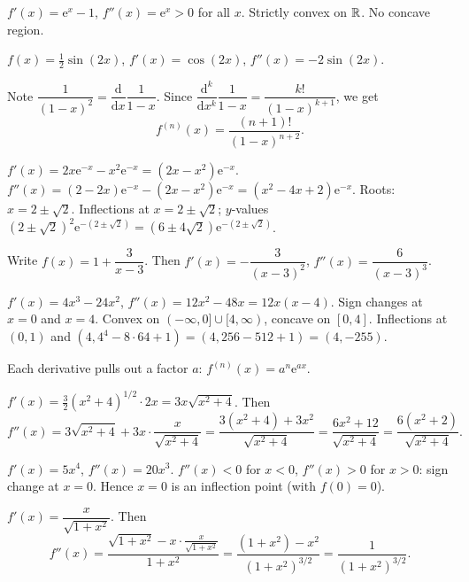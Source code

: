 \begin{solutions}
  \item $f'(x)=\mathrm{e}^{x}-1$, $f''(x)=\mathrm{e}^{x}>0$ for all $x$.
        Strictly convex on $\mathbb{R}$. No concave region.

  \item $f(x)=\tfrac12\sin(2x)$, $f'(x)=\cos(2x)$, $f''(x)=-2\sin(2x)$.

  \item Note $\dfrac{1}{(1-x)^{2}}=\dfrac{\mathrm{d}}{\mathrm{d}x}
        \dfrac{1}{1-x}$. Since
        $\dfrac{\mathrm{d}^{k}}{\mathrm{d}x^{k}}\dfrac{1}{1-x}
        =\dfrac{k!}{(1-x)^{k+1}}$, we get
        \[
          f^{(n)}(x)=\frac{(n+1)!}{(1-x)^{n+2}} .
        \]

  \item $f'(x)=2x\mathrm{e}^{-x}-x^{2}\mathrm{e}^{-x}=(2x-x^{2})\mathrm{e}^{-x}$.
        $f''(x)=(2-2x)\mathrm{e}^{-x}-(2x-x^{2})\mathrm{e}^{-x}
               =(x^{2}-4x+2)\mathrm{e}^{-x}$. Roots: $x=2\pm\sqrt{2}$.
        Inflections at $x=2\pm\sqrt{2}$; $y$-values
        $(2\pm\sqrt{2})^{2}\mathrm{e}^{-(2\pm\sqrt{2})}
        =(6\pm4\sqrt{2})\mathrm{e}^{-(2\pm\sqrt{2})}$.

  \item Write $f(x)=1+\dfrac{3}{x-3}$. Then $f'(x)=-\dfrac{3}{(x-3)^{2}}$,
        $f''(x)=\dfrac{6}{(x-3)^{3}}$.

  \item $f'(x)=4x^{3}-24x^{2}$, $f''(x)=12x^{2}-48x=12x(x-4)$. Sign
        changes at $x=0$ and $x=4$. Convex on $(-\infty,0]\cup[4,\infty)$,
        concave on $[0,4]$. Inflections at $(0,1)$ and
        $(4,4^{4}-8\cdot 64+1)=(4,256-512+1)=(4,-255)$.

  \item Each derivative pulls out a factor $a$: $f^{(n)}(x)=a^{n}\mathrm{e}^{ax}$.

  \item $f'(x)=\tfrac32(x^{2}+4)^{1/2}\cdot 2x=3x\sqrt{x^{2}+4}$. Then
        \[
          f''(x)=3\sqrt{x^{2}+4}+3x\cdot\frac{x}{\sqrt{x^{2}+4}}
                =\frac{3(x^{2}+4)+3x^{2}}{\sqrt{x^{2}+4}}
                =\frac{6x^{2}+12}{\sqrt{x^{2}+4}}
                =\frac{6(x^{2}+2)}{\sqrt{x^{2}+4}} .
        \]

  \item $f'(x)=5x^{4}$, $f''(x)=20x^{3}$. $f''(x)<0$ for $x<0$,
        $f''(x)>0$ for $x>0$: sign change at $x=0$. Hence $x=0$ is an
        inflection point (with $f(0)=0$).

  \item $f'(x)=\dfrac{x}{\sqrt{1+x^{2}}}$. Then
        \[
          f''(x)=\frac{\sqrt{1+x^{2}}-x\cdot\frac{x}{\sqrt{1+x^{2}}}}
                       {1+x^{2}}
                =\frac{(1+x^{2})-x^{2}}{(1+x^{2})^{3/2}}
                =\frac{1}{(1+x^{2})^{3/2}} .
        \]


\end{solutions}
